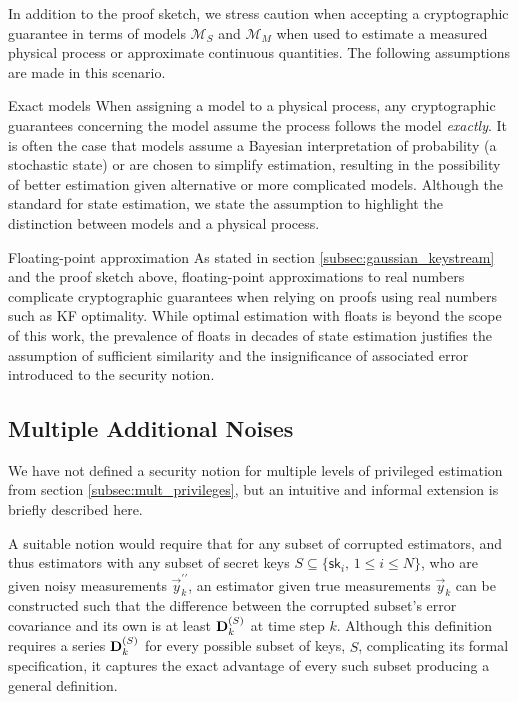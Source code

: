 \documentclass[letterpaper, 10 pt, conference]{ieeeconf}
\begin{document}
In addition to the proof sketch, we stress caution when accepting a cryptographic guarantee in terms of models $\mathcal{M}_S$ and $\mathcal{M}_M$ when used to estimate a measured physical process or approximate continuous quantities. The following assumptions are made in this scenario.
\begin{LaTeXdescription}
   \item[Exact models] When assigning a model to a physical process, any cryptographic guarantees concerning the model assume the process follows the model \textit{exactly}. It is often the case that models assume a Bayesian interpretation of probability (a stochastic state) or are chosen to simplify estimation, resulting in the possibility of better estimation given alternative or more complicated models. Although the standard for state estimation, we state the assumption to highlight the distinction between models and a physical process.
   \item[Floating-point approximation] As stated in section \ref{subsec:gaussian_keystream} and the proof sketch above, floating-point approximations to real numbers complicate cryptographic guarantees when relying on proofs using real numbers such as KF optimality. While optimal estimation with floats is beyond the scope of this work, the prevalence of floats in decades of state estimation justifies the assumption of sufficient similarity and the insignificance of associated error introduced to the security notion.
\end{LaTeXdescription}

% 
% 

\subsection{Multiple Additional Noises}
We have not defined a security notion for multiple levels of privileged estimation from section \ref{subsec:mult_privileges}, but an intuitive and informal extension is briefly described here. 

A suitable notion would require that for any subset of corrupted estimators, and thus estimators with any subset of secret keys $S \subseteq \{\mathsf{sk}_i,\,1\leq i\leq N\}$, who are given noisy measurements $\vec{y}_k^{\prime\prime}$, an estimator given true measurements $\vec{y}_k$ can be constructed such that the difference between the corrupted subset's error covariance and its own is at least ${{\mathbf{D}}}^{(S)}_k$ at time step $k$. Although this definition requires a series ${{\mathbf{D}}}^{(S)}_k$ for every possible subset of keys, $S$, complicating its formal specification, it captures the exact advantage of every such subset producing a general definition.
\end{document}
